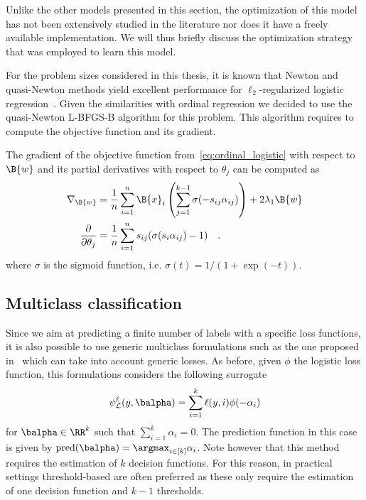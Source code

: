 Unlike the other models presented in this section, the optimization of this model has not been extensively studied in the literature nor does it have a freely available implementation. We will thus briefly discuss the optimization strategy that was employed to learn this model.

For the problem sizes considered in this thesis, it is known that Newton and quasi-Newton methods yield excellent performance for $\ell_2$-regularized logistic regression~\citep{lin2008trust, fan2008liblinear, NumericalOptimizers}. Given the similarities with ordinal regression we decided to use the quasi-Newton L-BFGS-B algorithm for this problem. This algorithm requires to compute the objective function and its gradient. 


The gradient of the objective function from~\eqref{eq:ordinal_logistic} with respect to $\B{w}$ and its partial derivatives with respect to $\theta_j$ can be computed as
\begin{equation}
\begin{aligned}
\nabla_{\B{w}}  &= 
\frac{1}{n}\sum_{i=1}^n \B{x}_i \left( \sum_{j=1}^{k-1} \sigma(-s_{ij}\alpha_{ij}) \right) + 2 \lambda_1 \B{w} \\
\frac{\partial}{\partial \theta_j}  &= \frac{1}{n} \sum_{i=1}^n s_{ij}(\sigma(s_{i} \alpha_{ij}) - 1) \quad.
\end{aligned}
\end{equation}
where $\sigma$ is the sigmoid function, i.e. $\sigma(t) = 1 / (1 + \exp(-t))$.



\subsection{Multiclass classification}


Since we aim at predicting a finite number of labels with a specific loss functions, it is also possible to use generic multiclass formulations such as the one proposed in~\citep{lee2004multicategory} which can take into account generic losses. As before, given $\phi$ the logistic loss function, this formulations considers the following surrogate
\begin{equation} \label{eq:multiclass}
\psi_{\mathcal{L}}^{\ell}(y, \balpha) = \sum_{i=1}^k \ell(y, i) \phi(-\alpha_i)
\end{equation}
for $\balpha \in \RR^k$ such that $\sum_{i=1}^k \alpha_i = 0$. The prediction function in this case is given by ${\rm pred}(\balpha) = \argmax_{i \in [k]} \alpha_i$. Note however that this method requires the estimation of $k$ decision functions. For this reason, in practical settings threshold-based are often preferred as these only require the estimation of one decision function and $k-1$ thresholds.

